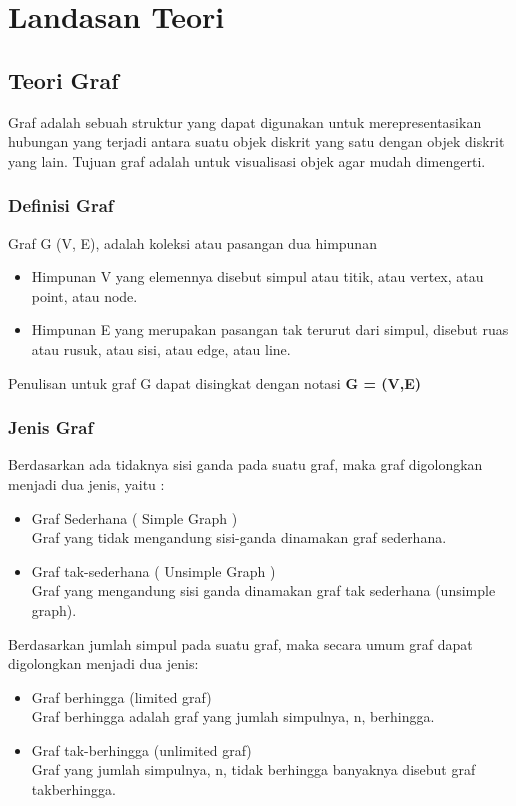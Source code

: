 \chapter{Landasan Teori}
\label{chap:teori}

\section{Teori Graf}
\label{sec:teori graf} 

Graf adalah sebuah struktur yang dapat
digunakan untuk merepresentasikan hubungan yang
terjadi antara suatu objek diskrit yang satu dengan
objek diskrit yang lain. Tujuan graf adalah untuk visualisasi objek agar mudah dimengerti.


\subsection{Definisi Graf}

Graf G (V, E), adalah koleksi atau pasangan dua himpunan
\begin{itemize}
\item Himpunan V yang elemennya disebut simpul atau titik, atau vertex, atau point,
atau node.
\item Himpunan E yang merupakan pasangan tak terurut dari simpul, disebut ruas
atau rusuk, atau sisi, atau edge, atau line.
\end{itemize}
 
 
Penulisan untuk graf G dapat disingkat dengan notasi \textbf{G = (V,E)}

\subsection{Jenis Graf}

Berdasarkan ada tidaknya sisi ganda
pada suatu graf, maka graf digolongkan menjadi
dua jenis, yaitu :
\begin{itemize}
\item Graf Sederhana ( Simple Graph )\\
Graf yang tidak mengandung sisi-ganda dinamakan graf
sederhana. 

\item Graf tak-sederhana ( Unsimple Graph )\\
Graf yang mengandung sisi ganda dinamakan graf tak sederhana
(unsimple graph).

\end{itemize}

Berdasarkan jumlah simpul pada suatu graf, maka secara umum graf dapat
digolongkan menjadi dua jenis:
\begin{itemize}
\item Graf berhingga (limited graf)\\
Graf berhingga adalah graf yang jumlah simpulnya, n, berhingga.


\item Graf tak-berhingga (unlimited graf)\\
Graf yang jumlah simpulnya, n, tidak berhingga banyaknya disebut graf takberhingga.

\end{itemize}


